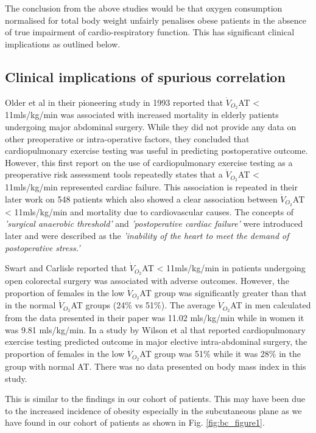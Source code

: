 The conclusion from the above studies would be that oxygen consumption normalised for total body weight unfairly penalises obese patients in the absence of true impairment of cardio-respiratory function. This has significant clinical implications as outlined below.

\subsection{Clinical implications of spurious correlation}
Older et al in their pioneering study in 1993 reported that $\dot{V}_{O_2}$AT < 11mls/kg/min was associated with increased mortality in elderly patients undergoing major abdominal surgery.\parencite{older_preoperative_1993} While they did not provide any data on other preoperative or intra-operative factors, they concluded that cardiopulmonary exercise testing was useful in predicting postoperative outcome. However, this first report on the use of cardiopulmonary exercise testing as a preoperative risk assessment tools repeatedly states that a $\dot{V}_{O_2}$AT < 11mls/kg/min represented cardiac failure. This association is repeated in their later work on 548 patients which also showed a clear association between $\dot{V}_{O_2}$AT < 11mls/kg/min and mortality due to cardiovascular causes. \parencite{older_cardiopulmonary_1999} The concepts of \textit{'surgical anaerobic threshold'} and \textit{'postoperative cardiac failure'} were introduced later and were described as the \textit{'inability of the heart to meet the demand of postoperative stress.'}\parencite{society_ats/accp_2003}

Swart and Carlisle reported that $\dot{V}_{O_2}$AT < 11mls/kg/min in patients undergoing open colorectal surgery was associated with adverse outcomes.\parencite{swart_case-controlled_2012} However, the proportion of females in the low $\dot{V}_{O_2}$AT group was significantly greater than that in the normal $\dot{V}_{O_2}$AT groups (24\% vs 51\%). The average $\dot{V}_{O_2}$AT in men calculated from the data presented in their paper was 11.02 mls/kg/min while in women it was 9.81 mls/kg/min. In a study by Wilson et al that reported cardiopulmonary exercise testing predicted outcome in major elective intra-abdominal surgery, the proportion of females in the low $\dot{V}_{O_2}$AT group was 51\% while it was 28\% in the group with normal AT.\parencite{wilson_impaired_2010} There was no data presented on body mass index in this study.

This is similar to the findings in our cohort of patients. This may have been due to the increased incidence of obesity especially in the subcutaneous plane as we have found in our cohort of patients as shown in Fig. \ref{fig:bc_figure1}.

